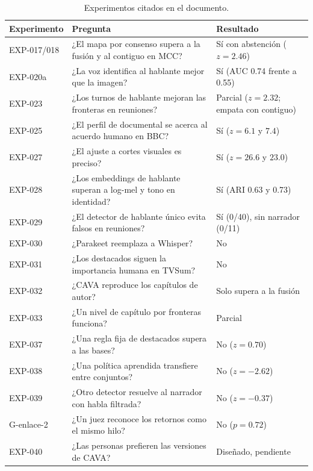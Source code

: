 \begin{table}[H]
    \centering
    \caption{Experimentos citados en el documento.}
    \label{tab:experimentos}
    \small
    \begin{tabular}{p{2.3cm}p{7.4cm}p{3.6cm}}
        \hline
        \textbf{Experimento} & \textbf{Pregunta} & \textbf{Resultado} \\
        \hline
        EXP-017/018 & ¿El mapa por consenso supera a la fusión y al contiguo en MCC? &
                      Sí con abstención ($z = 2.46$) \\
        EXP-020a & ¿La voz identifica al hablante mejor que la imagen? & Sí (AUC 0.74 frente
                   a 0.55) \\
        EXP-023 & ¿Los turnos de hablante mejoran las fronteras en reuniones? & Parcial ($z =
                  2.32$; empata con contiguo) \\
        EXP-025 & ¿El perfil de documental se acerca al acuerdo humano en BBC? & Sí ($z =
                  6.1$ y $7.4$) \\
        EXP-027 & ¿El ajuste a cortes visuales es preciso? & Sí ($z = 26.6$ y $23.0$) \\
        EXP-028 & ¿Los embeddings de hablante superan a log-mel y tono en identidad? & Sí
                  (ARI 0.63 y 0.73) \\
        EXP-029 & ¿El detector de hablante único evita falsos en reuniones? & Sí (0/40), sin
                  narrador (0/11) \\
        EXP-030 & ¿Parakeet reemplaza a Whisper? & No \\
        EXP-031 & ¿Los destacados siguen la importancia humana en TVSum? & No \\
        EXP-032 & ¿CAVA reproduce los capítulos de autor? & Solo supera a la fusión \\
        EXP-033 & ¿Un nivel de capítulo por fronteras funciona? & Parcial \\
        EXP-037 & ¿Una regla fija de destacados supera a las bases? & No ($z = 0.70$) \\
        EXP-038 & ¿Una política aprendida transfiere entre conjuntos? & No ($z = -2.62$) \\
        EXP-039 & ¿Otro detector resuelve al narrador con habla filtrada? & No ($z = -0.37$) \\
        G-enlace-2 & ¿Un juez reconoce los retornos como el mismo hilo? & No ($p = 0.72$) \\
        EXP-040 & ¿Las personas prefieren las versiones de CAVA? & Diseñado, pendiente \\
        \hline
    \end{tabular}
\end{table}


